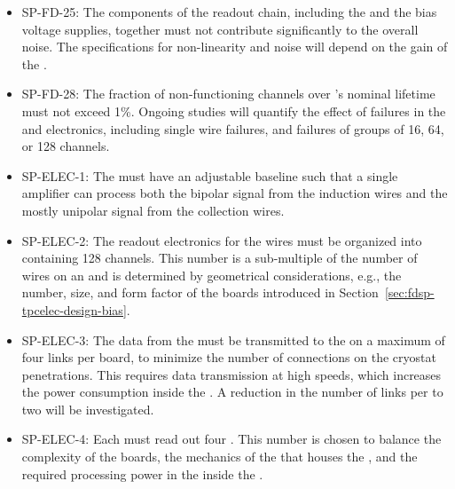 \begin{itemize}
\item SP-FD-25: 
The components of the readout chain, including the 
and the bias voltage supplies, together must not contribute significantly to
the overall noise. %
The  specifications for non-linearity and noise will depend on the gain of the .



\item SP-FD-28: The fraction of non-functioning channels over %
's nominal  \dunelifetime
lifetime %
must not exceed 1\%. Ongoing studies %
will quantify the effect of failures
in the  and electronics, including
single wire failures, and failures of groups of
\num{16}, \num{64}, or \num{128} channels.

\item SP-ELEC-1: The  must have an adjustable baseline such that a single
amplifier can process both the
bipolar signal from the induction wires and the mostly unipolar signal 
from the collection wires. %

\item SP-ELEC-2: The readout electronics for the  wires must be organized
into  containing 128 channels. This number is a sub-multiple
of the number of wires on an  and is %
determined
by geometrical considerations, e.g., the number, size, and form
factor of the  boards introduced in Section~\ref{sec:fdsp-tpcelec-design-bias}. %


\item SP-ELEC-3: The data from the  must be transmitted to the
 on a maximum of four links per board, to minimize
the number of connections on the cryostat penetrations. This 
requires data transmission at high speeds, which 
increases the power consumption inside the .
A reduction in the number of links per  to two
will be investigated.

\item SP-ELEC-4: Each  must read out four . This number
is chosen to %
balance %
the complexity of the boards, the mechanics
of the  that houses the , and the 
required processing power in the  inside the
.


\end{itemize}
